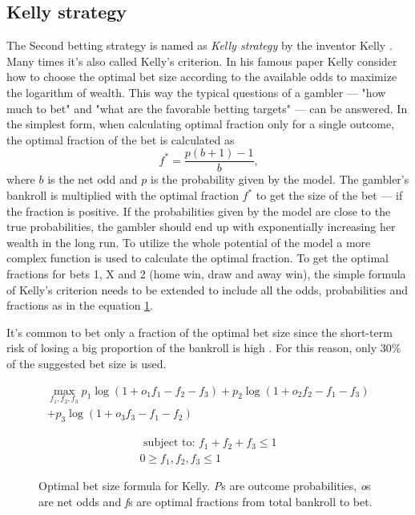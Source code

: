 \subsection{Kelly strategy}
The Second betting strategy is named as \textit{Kelly strategy} by the inventor Kelly \cite{kelly2011new}. Many times it's also called Kelly's criterion. In his famous paper \cite{kelly2011new} Kelly consider how to choose the optimal bet size according to the available odds to maximize the logarithm of wealth. This way the typical questions of a gambler --- "how much to bet" and "what are the favorable betting targets" ---  can be answered. In the simplest form, when calculating optimal fraction only for a single outcome, the optimal fraction of the bet is calculated as
\begin{equation}
f ^ { * } =  \frac { p ( b + 1 ) - 1 } { b }\text{,}
\end{equation}
where $b$ is the net odd and $p$ is the probability given by the model. The gambler's bankroll is multiplied with the optimal fraction $f^{*}$ to get the size of the bet --- if the fraction is positive. If the probabilities given by the model are close to the true probabilities, the gambler should end up with exponentially increasing her wealth in the long run. To utilize the whole potential of the model a more complex function is used to calculate the optimal fraction. To get the optimal fractions for bets 1, X and 2 (home win, draw and away win), the simple formula of Kelly's criterion needs to be extended to include all the odds, probabilities and fractions as in the equation \ref{eq:kelly}.

It's common to bet only a fraction of the optimal bet size since the short-term risk of losing a big proportion of the bankroll is high \cite{maclean2011medium}. For this reason, only 30\% of the suggested bet size is used.
\begin{figure}
    \caption{Optimal bet size formula for Kelly. \textit{P}s are outcome probabilities, \textit{o}s are net odds and \textit{f}s are optimal fractions from total bankroll to bet.}
     \begin{equation}
        \begin{split}
            \max_{f_1, f_2, f_3} p_1  \log(1 + o_1 f_1 - f_2 - f_3) + p_2 \log(1 + o_2 f_2 - f_1 - f_3)  \\
            + p_3 \log(1 + o_3 f_3 - f_1 - f_2)
        \end{split}
     \end{equation}

    \begin{equation*}
        \begin{split}
            \text { subject to: }  f_1 + f_2 + f_3 \leq 1 \\
             0 \geq f_1, f_2, f_3 \leq 1
         \end{split}
    \end{equation*}
    \label{eq:kelly}
\end{figure}

